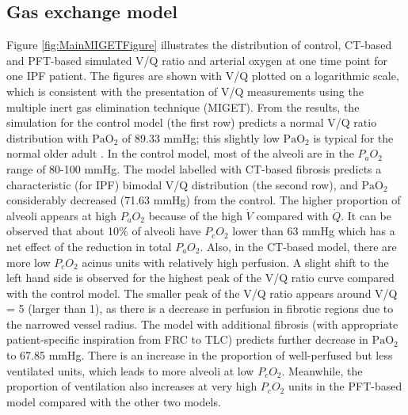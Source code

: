 \subsection{Gas exchange model}
Figure \ref{fig:MainMIGETFigure} illustrates the distribution of control, CT-based and PFT-based simulated V/Q ratio and arterial oxygen at one time point for one IPF patient. The figures are shown with V/Q plotted on a logarithmic scale, which is consistent with the presentation of V/Q measurements using the multiple inert gas elimination technique (MIGET). From the results, the simulation for the control model (the first row) predicts a normal V/Q ratio distribution with $\mathrm{PaO_2}$ of 89.33 mmHg; this slightly low $\mathrm{PaO_2}$ is typical for the normal older adult \citep{wahba1983influence, sprung2006age}. In the control model, most of the alveoli are in the $P_aO_2$ range of 80-100 mmHg. The model labelled with CT-based fibrosis predicts a characteristic (for IPF) bimodal V/Q distribution (the second row), and $\mathrm{PaO_2}$ considerably decreased (71.63 mmHg) from the control. The higher proportion of alveoli appears at high $P_aO_2$ because of the high $\dot{V}$ compared with $\dot{Q}$. It can be observed that about 10\% of alveoli have $P_cO_2$ lower than 63 mmHg which has a net effect of the reduction in total $P_aO_2$. Also, in the CT-based model, there are more low $P_cO_2$ acinus units with relatively high perfusion. A slight shift to the left hand side is observed for the highest peak of the V/Q ratio curve compared with the control model. The smaller peak of the V/Q ratio appears around V/Q = 5 (larger than 1), as there is a decrease in perfusion in fibrotic regions due to the narrowed vessel radius. The model with additional fibrosis (with appropriate patient-specific inspiration from FRC to TLC) predicts further decrease in $\mathrm{PaO_2}$ to 67.85 mmHg. There is an increase in the proportion of well-perfused but less ventilated units, which leads to more alveoli at low $P_cO_2$. Meanwhile, the proportion of ventilation also increases at very high $P_cO_2$ units in the PFT-based model compared with the other two models.

